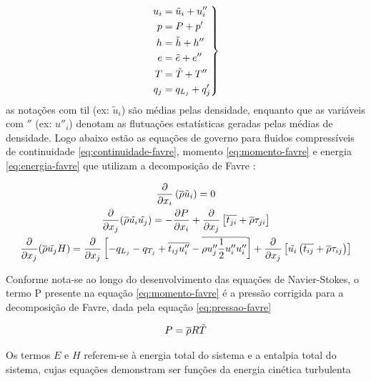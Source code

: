\begin{equation}
\left. \begin{aligned}
  u_i &= \tilde{u}_i + u''_i \\
  p &= P + p' \\
  h &= \Tilde{h} + h'' \\
  e &= \Tilde{e} + e'' \\
  T &= \Tilde{T} + T'' \\
  q_j & = q_{L_j} + q'_j
\end{aligned}
\right\rbrace
\end{equation}
%
as notações com til (ex: \(\tilde{u}_i\)) são médias pelas densidade, enquanto que as variáveis com \(''\) (ex: \(u''_i\)) denotam as flutuações estatísticas geradas pelas médias de densidade. Logo abaixo estão as equações de governo para fluidos compressíveis de continuidade \ref{eq:continuidade-favre}, momento \ref{eq:momento-favre} e energia \ref{eq:energia-favre} que utilizam a decomposição de Favre \cite{Wilcox2006}:

\begin{gather}
    \label{eq:continuidade-favre}
    \frac{\partial}{\partial x_i} \left( \overline{\rho} \Tilde{u}_{i}\right) = 0 \\
    \label{eq:momento-favre}
    \frac{\partial}{\partial x_j} (\overline{\rho}\Tilde{u_i}\Tilde{u_j}) = -\frac{\partial P}{\partial x_i} + \frac{\partial}{\partial x_j}\left[\overline{t_{ji}} + \overline{\rho}\tau_{ji}\right] \\
    \label{eq:energia-favre} 
    \frac{\partial}{\partial x_j}(\overline{\rho} \Tilde{u_{j}} H) 
    = \frac{\partial}{\partial x_j}\left[-q_{L_{j}} - q_{T_{j}} + \overline{t_{ij}u''_i} - \overline{\rho u''_j\frac{1}{2}u''_i u''_i} \right] + \frac{\partial}{\partial x_j}\left[\Tilde{u_i}\left(\overline{t_{ij}} + \overline{\rho}\tau_{ij}\right)\right]
\end{gather}

Conforme nota-se ao longo do desenvolvimento das equações de Navier-Stokes, o termo P presente na equação \ref{eq:momento-favre} é a pressão corrigida para a decomposição de Favre, dada pela equação \ref{eq:pressao-favre}

\begin{equation}
	\label{eq:pressao-favre}
	P = \overline{\rho}R\Tilde{T}
\end{equation} 

Os termos \(E\) e \(H\) referem-se à energia total do sistema e a entalpia total do sistema, cujas equações demonstram ser funções da energia cinética turbulenta

